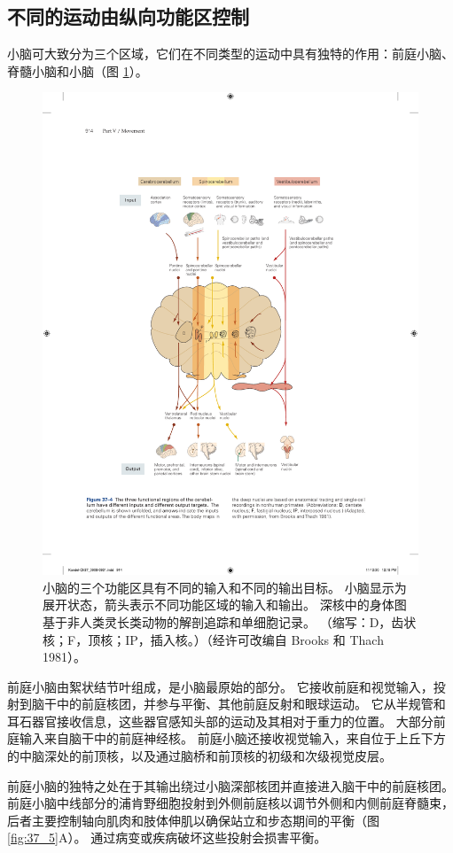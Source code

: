 \subsection{不同的运动由纵向功能区控制}

小脑可大致分为三个区域，它们在不同类型的运动中具有独特的作用：前庭小脑、脊髓小脑和小脑（图 \ref{fig:37_4}）。

\begin{figure}[htbp]
	\centering
	\includegraphics[width=0.7\linewidth]{chap37/fig_37_4}
	\caption{小脑的三个功能区具有不同的输入和不同的输出目标。 小脑显示为展开状态，箭头表示不同功能区域的输入和输出。 深核中的身体图基于非人类灵长类动物的解剖追踪和单细胞记录。 （缩写：D，齿状核；F，顶核；IP，插入核。）（经许可改编自 Brooks 和 Thach 1981）。}
	\label{fig:37_4}
\end{figure}

前庭小脑由絮状结节叶组成，是小脑最原始的部分。 它接收前庭和视觉输入，投射到脑干中的前庭核团，并参与平衡、其他前庭反射和眼球运动。 它从半规管和耳石器官接收信息，这些器官感知头部的运动及其相对于重力的位置。 大部分前庭输入来自脑干中的前庭神经核。 前庭小脑还接收视觉输入，来自位于上丘下方的中脑深处的前顶核，以及通过脑桥和前顶核的初级和次级视觉皮层。

前庭小脑的独特之处在于其输出绕过小脑深部核团并直接进入脑干中的前庭核团。 
前庭小脑中线部分的浦肯野细胞投射到外侧前庭核以调节外侧和内侧前庭脊髓束，后者主要控制轴向肌肉和肢体伸肌以确保站立和步态期间的平衡（图 \ref{fig:37_5}A）。 
通过病变或疾病破坏这些投射会损害平衡。

